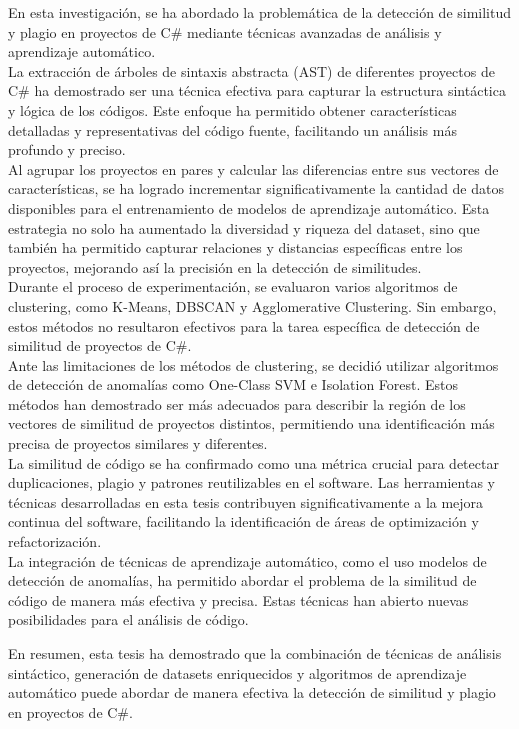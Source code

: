 \begin{conclusions}

En esta investigación, se ha abordado la problemática de la detección de similitud y plagio en proyectos de C\# mediante técnicas avanzadas de análisis y aprendizaje automático.\\

 La extracción de árboles de sintaxis abstracta (AST) de diferentes proyectos de C\# ha demostrado ser una técnica efectiva para capturar la estructura sintáctica y lógica de los códigos. Este enfoque ha permitido obtener características detalladas y representativas del código fuente, facilitando un análisis más profundo y preciso.\\

 Al agrupar los proyectos en pares y calcular las diferencias entre sus vectores de características, se ha logrado incrementar significativamente la cantidad de datos disponibles para el entrenamiento de modelos de aprendizaje automático. Esta estrategia no solo ha aumentado la diversidad y riqueza del dataset, sino que también ha permitido capturar relaciones y distancias específicas entre los proyectos, mejorando así la precisión en la detección de similitudes.\\

Durante el proceso de experimentación, se evaluaron varios algoritmos de clustering, como K-Means, DBSCAN y Agglomerative Clustering. Sin embargo, estos métodos no resultaron efectivos para la tarea específica de detección de similitud de proyectos de C\#. \\

 Ante las limitaciones de los métodos de clustering, se decidió utilizar algoritmos de detección de anomalías como One-Class SVM e Isolation Forest. Estos métodos han demostrado ser más adecuados para describir la región de los vectores de similitud de proyectos distintos, permitiendo una identificación más precisa de proyectos similares y diferentes.\\

 La similitud de código se ha confirmado como una métrica crucial para detectar duplicaciones, plagio y patrones reutilizables en el software. Las herramientas y técnicas desarrolladas en esta tesis contribuyen significativamente a la mejora continua del software, facilitando la identificación de áreas de optimización y refactorización.\\

 La integración de técnicas de aprendizaje automático, como el uso modelos de detección de anomalías, ha permitido abordar el problema de la similitud de código de manera más efectiva y precisa. Estas técnicas han abierto nuevas posibilidades para el análisis de código.

En resumen, esta tesis ha demostrado que la combinación de técnicas de análisis sintáctico, generación de datasets enriquecidos y algoritmos de aprendizaje automático puede abordar de manera efectiva la detección de similitud y plagio en proyectos de C\#.

\end{conclusions}
